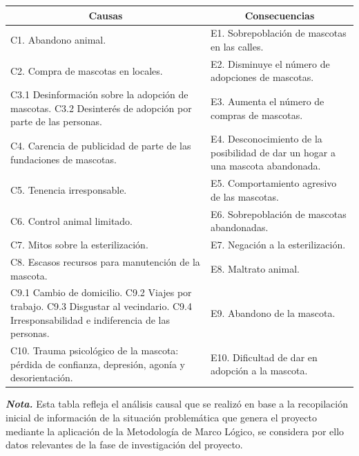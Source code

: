 \documentclass[12pt, a4paper, nofontenc, numbers=endperiod]{apa7}
\begin{document}
{\begin{table}[h]
		{\renewcommand{\arraystretch}{1.5} 
			\begin{tabular}{p{6cm}p{9.1cm}}
				\toprule
				\multicolumn{1}{c}{Causas} &  \multicolumn{1}{c}{Consecuencias} \\
				\midrule
				C1. Abandono animal. &  E1. Sobrepoblación de mascotas en las calles. \\
				
				C2. Compra de mascotas en locales. &  E2. Disminuye el número de adopciones de mascotas.\\
				
				C3.1 Desinformación sobre la adopción de mascotas.
				C3.2 Desinterés de adopción por parte de las personas.
				&  E3. Aumenta el número de compras de mascotas.\\
				
				C4. Carencia de publicidad de parte de las fundaciones de mascotas. &  E4. Desconocimiento de la posibilidad de dar un hogar a una mascota abandonada. \\
				
				C5. Tenencia irresponsable. &  E5. Comportamiento agresivo de las mascotas. \\
				
				C6. Control animal limitado. &  E6. Sobrepoblación de mascotas abandonadas. \\
				
				C7. Mitos sobre la esterilización. &  E7. Negación a la esterilización. \\
				
				C8. Escasos recursos para manutención de la mascota. &  E8. Maltrato animal. \\
				
				C9.1 Cambio de domicilio. \newline
				C9.2 Viajes por trabajo. \newline
				C9.3 Disgustar al vecindario.  \newline
				C9.4 Irresponsabilidad e indiferencia de las personas.
				&  E9. Abandono de la mascota. \\
				
				C10. Trauma psicológico de la mascota: pérdida de confianza, depresión, agonía y desorientación. &  E10. Dificultad de dar en adopción a la mascota. \\
				\midrule
			\end{tabular}
		
			\begin{tablenotes}[para,flushleft]
			{\small
				\textit{\textbf{Nota.}} Esta tabla refleja el análisis causal que se realizó en base a la recopilación inicial de información de la situación problemática que genera el proyecto mediante la aplicación de la Metodología de Marco Lógico, se considera por ello datos relevantes de la fase de investigación del proyecto.
			}
		\end{tablenotes}
		}
	\end{table}
	
}
\end{document}

